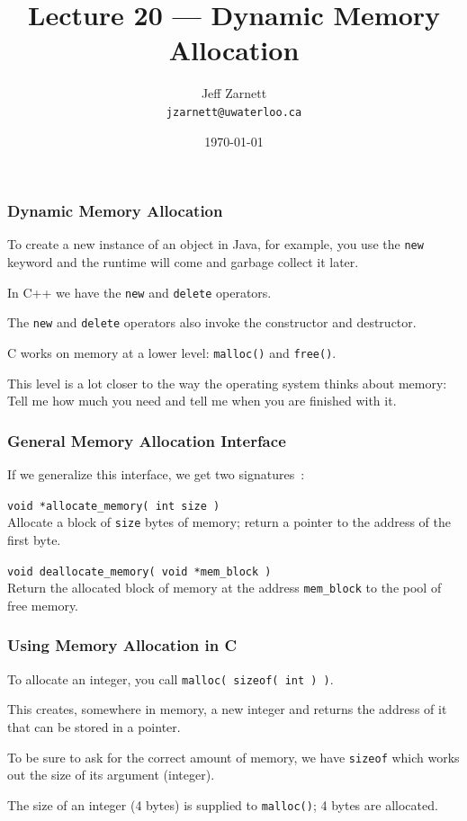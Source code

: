 

\title{Lecture 20 --- Dynamic Memory Allocation}

\author{Jeff Zarnett \\ \small \texttt{jzarnett@uwaterloo.ca}}
\date{\today}




\begin{frame}
  \titlepage

 \end{frame}
 
 

\begin{frame}
\frametitle{Dynamic Memory Allocation}

To create a new instance of an object in Java, for example, you use the \texttt{new} keyword and the runtime will come and garbage collect it later.

In C++ we have the \texttt{new} and \texttt{delete} operators. 

The \texttt{new} and \texttt{delete} operators also invoke the constructor and destructor. 

C works on memory at a lower level: \texttt{malloc()} and \texttt{free()}. 

This level is a lot closer to the way the operating system thinks about memory: \\
\quad Tell me how much you need and tell me when you are finished with it.


\end{frame}

\begin{frame}
\frametitle{General Memory Allocation Interface}

If we generalize this interface, we get two signatures~\cite{mte241}:

\texttt{void *allocate\_memory( int size )}\\
Allocate a block of \texttt{size} bytes of memory; return a pointer to the address of the first byte.

\texttt{void deallocate\_memory( void *mem\_block )}\\
Return the allocated block of memory at the address \texttt{mem\_block} to the pool of free memory.


\end{frame}

\begin{frame}
\frametitle{Using Memory Allocation in C}

To allocate an integer, you call \texttt{malloc( sizeof( int ) )}. 

This creates, somewhere in memory, a new integer and returns the address of it that can be stored in a pointer.

To be sure to ask for the correct amount of memory, we have \texttt{sizeof} which works out the size of its argument (integer).

The size of an integer (4 bytes) is supplied to \texttt{malloc()}; 4 bytes are allocated. 

\end{frame}

